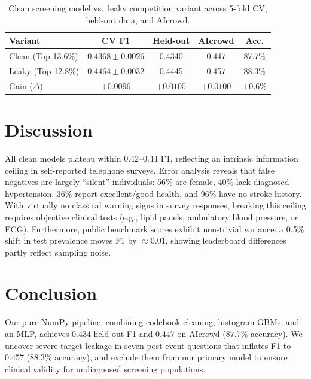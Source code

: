 \documentclass[10pt,conference,compsocconf]{IEEEtran}
\begin{document}
\begin{table}[tbp]
  \centering
  \vspace{-2mm}
  \footnotesize
  \caption{Clean screening model vs.\ leaky competition variant across 5-fold CV, held-out data, and AIcrowd.}
  \label{tab:leak}
  \setlength{\tabcolsep}{2.0pt}
  \begin{tabular}{lcccc}
    \toprule
    Variant & CV F1 & Held-out & AIcrowd & Acc. \\
    \midrule
    Clean (Top 13.6\%) & $0.4368 \pm 0.0026$ & 0.4340 & 0.447 & 87.7\% \\
    Leaky (Top 12.8\%) & $0.4464 \pm 0.0032$ & 0.4445 & 0.457 & 88.3\% \\
    \midrule
    Gain ($\Delta$) & $+0.0096$ & $+0.0105$ & $+0.0100$ & $+0.6\%$ \\
    \bottomrule
  \end{tabular}
  \vspace{-3mm}
\end{table}

\section{Discussion}
\label{sec:discussion}
All clean models plateau within 0.42--0.44 F1, reflecting an intrinsic information ceiling in self-reported telephone surveys. Error analysis reveals that false negatives are largely ``silent'' individuals: 56\% are female, 40\% lack diagnosed hypertension, 36\% report excellent/good health, and 96\% have no stroke history. With virtually no classical warning signs in survey responses, breaking this ceiling requires objective clinical tests (e.g., lipid panels, ambulatory blood pressure, or ECG). Furthermore, public benchmark scores exhibit non-trivial variance: a 0.5\% shift in test prevalence moves F1 by $\approx 0.01$, showing leaderboard differences partly reflect sampling noise.

\section{Conclusion}
\label{sec:conclusion}
Our pure-NumPy pipeline, combining codebook cleaning, histogram GBMs, and an MLP, achieves 0.434 held-out F1 and 0.447 on AIcrowd (87.7\% accuracy). We uncover severe target leakage in seven post-event questions that inflates F1 to 0.457 (88.3\% accuracy), and exclude them from our primary model to ensure clinical validity for undiagnosed screening populations.

\newpage


\end{document}
